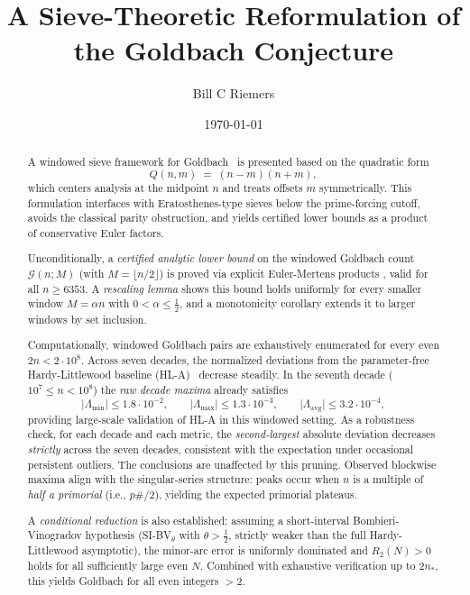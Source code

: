 \documentclass[11pt]{article}
\title{A Sieve-Theoretic Reformulation of the Goldbach Conjecture}
\author{Bill C Riemers}
\date{\today}
\theoremstyle{inline}
\theoremstyle{break}
\theoremstyle{break}
\theoremstyle{break}
\theoremstyle{break}
\theoremstyle{break}
\theoremstyle{break}
\theoremstyle{break}
\theoremstyle{inline}
\newcommand{\xMertens}{6353} %
\newcommand{\xLambdaMinLimit}{1.8\cdot 10^{-2}} %
\newcommand{\xLambdaMaxLimit}{1.3\cdot 10^{-3}} %
\newcommand{\xLambdaAvgLimit}{3.2\cdot 10^{-4}} %
\newcommand{\tavg}{{\scriptscriptstyle\mathrm{avg}}}
\newcommand{\nprodstar}{n_{\ast}}  %
\begin{document}
\maketitle

\begin{abstract}
A windowed sieve framework for Goldbach~\cite{GoldbachSurvey,Ribenboim1991} is presented based on the quadratic form
\begin{equation}
Q(n,m)\;=\;(n-m)(n+m),
\end{equation}
which centers analysis at the midpoint \(n\) and treats offsets \(m\) symmetrically. This formulation interfaces with Eratosthenes-type sieves below the prime-forcing cutoff, avoids the classical parity obstruction, and yields certified lower bounds as a product of conservative Euler factors.

Unconditionally, a \emph{certified analytic lower bound} on the windowed Goldbach count \(\mathcal{G}(n;M)\) (with \(M=\lfloor n/2\rfloor\)) is proved via explicit Euler-Mertens products \cite{Mertens1874,MontgomeryVaughan2007,RosserSchoenfeld1962,Dusart2010}, valid for all \(n\ge \xMertens\). A \emph{rescaling lemma} shows this bound holds uniformly for every smaller window \(M=\alpha n\) with \(0<\alpha\le \tfrac12\), and a monotonicity corollary extends it to larger windows by set inclusion.

Computationally, windowed Goldbach pairs are exhaustively enumerated for every even \(2n<2\cdot 10^8\). 
Across seven decades, the normalized deviations from the parameter-free Hardy-Littlewood baseline (HL-A)~\cite{HardyLittlewood1923} decrease steadily. 
In the seventh decade (\(10^7 \le n < 10^8\)) the \emph{raw decade maxima} already satisfies
\begin{equation}
\lvert\Lambda_{\min}\rvert\le \xLambdaMinLimit,\qquad
\lvert\Lambda_{\max}\rvert\le \xLambdaMaxLimit,\qquad
\lvert\Lambda_{\tavg}\rvert\le \xLambdaAvgLimit,
\end{equation}
providing large-scale validation of HL-A in this windowed setting.
As a robustness check, for each decade and each metric, the \emph{second-largest} absolute deviation decreases \emph{strictly} across the seven decades, consistent with the expectation under occasional persistent outliers.  The conclusions are unaffected by this pruning.
Observed blockwise maxima align with the singular-series structure: peaks occur when \(n\) is a multiple of \emph{half a primorial} (i.e., \(p\#/2\)), yielding the expected primorial plateaus.

A \emph{conditional reduction} is also established: assuming a short-interval Bombieri-Vinogradov hypothesis (SI-BV\(_\theta\) with \(\theta>\tfrac12\), strictly weaker than the full Hardy-Littlewood asymptotic), the minor-arc error is uniformly dominated and \(R_2(N)>0\) holds for all sufficiently large even \(N\). Combined with exhaustive verification up to \(2\nprodstar\), this yields Goldbach for all even integers \(>2\).


\end{abstract}
\end{document}

